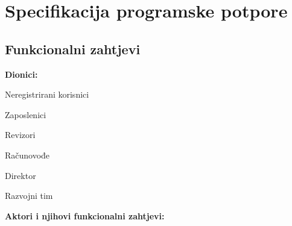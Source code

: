 \chapter{Specifikacija programske potpore}
		
	\section{Funkcionalni zahtjevi}
		
			\noindent \textbf{Dionici:}
			
			\begin{packed_enum}
				
				\item Neregistrirani korisnici
				\item Zaposlenici
				\item Revizori	
				\item Računovođe
				\item Direktor
				\item Razvojni tim
				
			\end{packed_enum}
			
			\noindent \textbf{Aktori i njihovi funkcionalni zahtjevi:}
			

